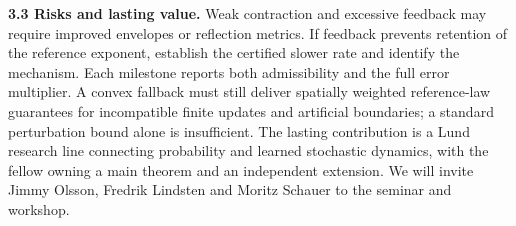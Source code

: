 \documentclass[12pt,a4paper]{article}
\begin{document}
\textbf{3.3 Risks and lasting value.}
Weak contraction and excessive feedback may require improved envelopes or reflection metrics. If feedback prevents retention of the reference exponent, establish the certified slower rate and identify the mechanism. Each milestone reports both admissibility and the full error multiplier. A convex fallback must still deliver spatially weighted reference-law guarantees for incompatible finite updates and artificial boundaries; a standard perturbation bound alone is insufficient. The lasting contribution is a Lund research line connecting probability and learned stochastic dynamics, with the fellow owning a main theorem and an independent extension. We will invite Jimmy Olsson, Fredrik Lindsten and Moritz Schauer to the seminar and workshop.

\begingroup
\fontsize{9}{10.5}\selectfont
\end{document}
